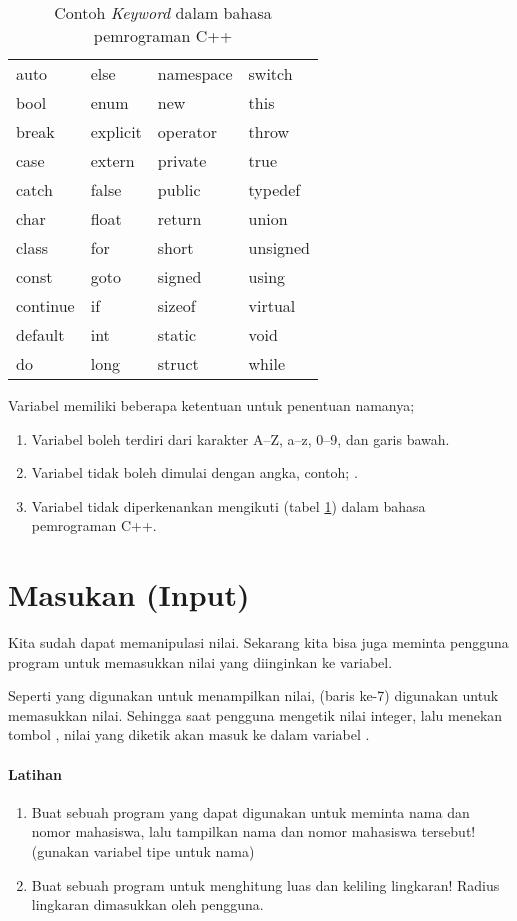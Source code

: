 \documentclass[../main.tex]{subfiles}
\begin{document}
\begin{table}[htb]
\centering
\begin{tabular}{@{} l l l l @{}}
  \toprule
  auto & else & namespace & switch\\
  bool & enum & new & this\\
  break & explicit & operator & throw\\
  case & extern & private & true\\
  catch & false & public & typedef\\
  char & float & return & union\\
  class & for & short & unsigned\\
  const & goto & signed & using\\
  continue & if & sizeof & virtual\\
  default & int & static & void\\
  do & long & struct & while\\
  \bottomrule
\end{tabular}
\caption{Contoh \emph{Keyword} dalam bahasa pemrograman C++}
\label{ex-keyword}
\end{table}

Variabel memiliki beberapa ketentuan untuk penentuan namanya;
\begin{enumerate}
  \item Variabel boleh terdiri dari karakter A--Z, a--z, 0--9, dan garis bawah.
  \item Variabel tidak boleh dimulai dengan angka, contoh; .
  \item Variabel tidak diperkenankan mengikuti  (tabel
  \ref{ex-keyword}) dalam bahasa pemrograman C++.
\end{enumerate}

\section{Masukan (Input)}
Kita sudah dapat memanipulasi nilai. Sekarang kita bisa juga meminta pengguna
program untuk memasukkan nilai yang diinginkan ke variabel.


Seperti  yang digunakan untuk menampilkan nilai, 
(baris ke-7) digunakan untuk memasukkan nilai. Sehingga saat pengguna mengetik
nilai integer, lalu menekan tombol , nilai yang diketik akan masuk
ke dalam variabel .

\paragraph{Latihan}
\begin{enumerate}
  \item Buat sebuah program yang dapat digunakan untuk meminta nama dan nomor
  mahasiswa, lalu tampilkan nama dan nomor mahasiswa tersebut! (gunakan variabel
  tipe  untuk nama)
  \item Buat sebuah program untuk menghitung luas dan keliling lingkaran! Radius
  lingkaran dimasukkan oleh pengguna.
\end{enumerate}
\end{document}
